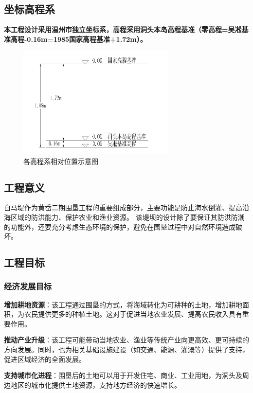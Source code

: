 \documentclass[UTF8, a4paper, 12pt]{ctexart} %
\begin{document}
\subsection{坐标高程系}
\textbf{本工程设计采用温州市独立坐标系，高程采用洞头本岛高程基准（零高程=吴凇基准高程-0.16m=1985国家高程基准+1.72m）。}

\begin{figure}[h]
    \centering
    \includegraphics[width=0.7\textwidth]{1.png}
    \caption{各高程系相对位置示意图}
    \label{fig:location}
\end{figure}

\newpage
\subsection{工程意义}
白马堤作为黄岙二期围垦工程的重要组成部分，主要功能是防止海水倒灌、提高沿海区域的防洪能力、保护农业和渔业资源。
该堤坝的设计除了要保证其防洪防潮的功能外，还要充分考虑生态环境的保护，避免在围垦过程中对自然环境造成破坏。
\subsection{工程目标}
\subsubsection{经济发展目标}
\textbf{增加耕地资源}：该工程通过围垦的方式，将海域转化为可耕种的土地，增加耕地面积，为农民提供更多的种植土地。这对于促进当地农业发展、提高农民收入具有重要作用。
\par \textbf{推动产业升级}：该工程可能带动当地农业、渔业等传统产业向更高效、更可持续的方向发展。同时，也为相关基础设施建设（如交通、能源、灌溉等）提供了支持，促进区域经济的全面发展。
\par \textbf{支持城市化进程}：围垦后的土地可以用于开发住宅、商业、工业用地，为洞头及周边地区的城市化提供土地资源，支持地方经济的快速增长。
\end{document}
